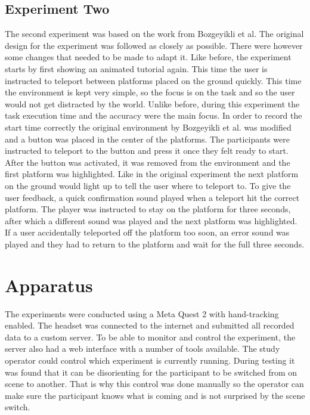 \subsection{Experiment Two}
The second experiment was based on the work from Bozgeyikli et al. %
The original design for the experiment was followed as closely as possible. There were however some changes that needed to be made to adapt it. Like before, the experiment starts by first showing an animated tutorial again. This time the user is instructed to teleport between platforms placed on the ground quickly. This time the environment is kept very simple, so the focus is on the task and so the user would not get distracted by the world. Unlike before, during this experiment the task execution time and the accuracy were the main focus. In order to record the start time correctly the original environment by Bozgeyikli et al. was modified and a button was placed in the center of the platforms. The participants were instructed to teleport to the button and press it once they felt ready to start. After the button was activated, it was removed from the environment and the first platform was highlighted. Like in the original experiment the next platform on the ground would light up to tell the user where to teleport to. To give the user feedback, a quick confirmation sound played when a teleport hit the correct platform. The player was instructed to stay on the platform for three seconds, after which a different sound was played and the next platform was highlighted. If a user accidentally teleported off the platform too soon, an error sound was played and they had to return to the platform and wait for the full three seconds. 


\section{Apparatus}

The experiments were conducted using a Meta Quest 2 with hand-tracking enabled. The headset was connected to the internet and submitted all recorded data to a custom server. To be able to monitor and control the experiment, the server also had a web interface with a number of tools available. The study operator could control which experiment is currently running. During testing it was found that it can be disorienting for the participant to be switched from on scene to another. That is why this control was done manually so the operator can make sure the participant knows what is coming and is not surprised by the scene switch.

